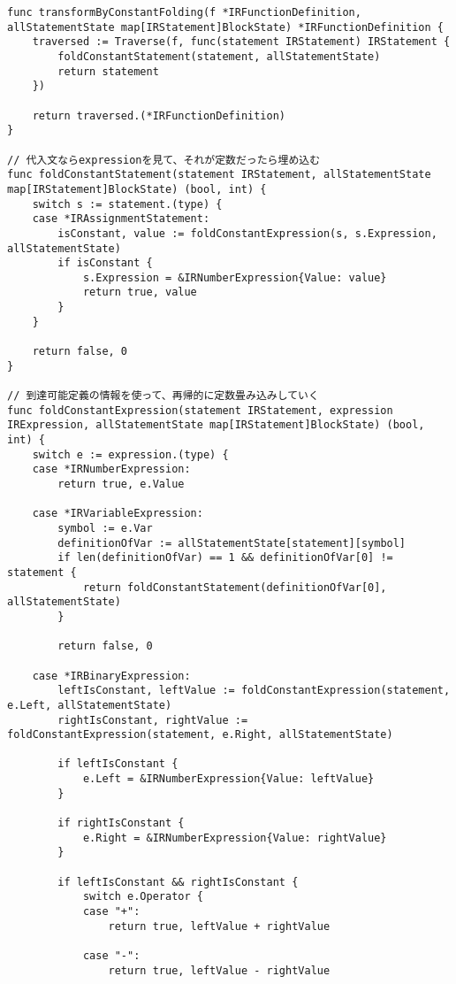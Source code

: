 \documentclass[a4j]{jarticle}
\begin{document}
\begin{verbatim}
func transformByConstantFolding(f *IRFunctionDefinition, allStatementState map[IRStatement]BlockState) *IRFunctionDefinition {
    traversed := Traverse(f, func(statement IRStatement) IRStatement {
        foldConstantStatement(statement, allStatementState)
        return statement
    })

    return traversed.(*IRFunctionDefinition)
}

// 代入文ならexpressionを見て、それが定数だったら埋め込む
func foldConstantStatement(statement IRStatement, allStatementState map[IRStatement]BlockState) (bool, int) {
    switch s := statement.(type) {
    case *IRAssignmentStatement:
        isConstant, value := foldConstantExpression(s, s.Expression, allStatementState)
        if isConstant {
            s.Expression = &IRNumberExpression{Value: value}
            return true, value
        }
    }

    return false, 0
}

// 到達可能定義の情報を使って、再帰的に定数畳み込みしていく
func foldConstantExpression(statement IRStatement, expression IRExpression, allStatementState map[IRStatement]BlockState) (bool, int) {
    switch e := expression.(type) {
    case *IRNumberExpression:
        return true, e.Value

    case *IRVariableExpression:
        symbol := e.Var
        definitionOfVar := allStatementState[statement][symbol]
        if len(definitionOfVar) == 1 && definitionOfVar[0] != statement {
            return foldConstantStatement(definitionOfVar[0], allStatementState)
        }

        return false, 0

    case *IRBinaryExpression:
        leftIsConstant, leftValue := foldConstantExpression(statement, e.Left, allStatementState)
        rightIsConstant, rightValue := foldConstantExpression(statement, e.Right, allStatementState)

        if leftIsConstant {
            e.Left = &IRNumberExpression{Value: leftValue}
        }

        if rightIsConstant {
            e.Right = &IRNumberExpression{Value: rightValue}
        }

        if leftIsConstant && rightIsConstant {
            switch e.Operator {
            case "+":
                return true, leftValue + rightValue

            case "-":
                return true, leftValue - rightValue


\end{verbatim}
\end{document}
